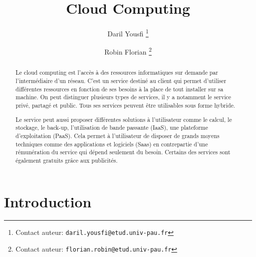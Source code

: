 \documentclass[a4 paper, 12 pt]{article}
\author[1]{Daril Yousfi \thanks{Contact auteur: \texttt{daril.yousfi@etud.univ-pau.fr}} \and {Robin Florian \thanks{Contact auteur: \texttt{florian.robin@etud.univ-pau.fr}}}}
\title{Cloud Computing}
\date {}
\begin{document}
\maketitle

\tableofcontents

\listoffigures

\listoftables

\newpage

\begin{abstract}
Le cloud computing est l’accès à des ressources informatiques sur demande par l’intermédiaire d’un réseau. C’est un service destiné au client qui permet d’utiliser différentes ressources en fonction de ses besoins à la place de tout installer sur sa machine. On peut distinguer plusieurs types de services, il y a notamment le service privé, partagé et public. Tous ses services peuvent être utilisables sous forme hybride. \newline

Le service peut aussi proposer différentes solutions à l’utilisateur comme le calcul, le stockage, le back-up, l’utilisation de bande passante (IaaS), une plateforme d’exploitation (PaaS). Cela permet à l’utilisateur de disposer de grands moyens techniques comme des applications et logiciels (Saas) en contrepartie d’une rémunération du service qui dépend seulement du besoin. Certains des services sont également gratuits grâce aux publicités.
\end{abstract}

 \section{Introduction}
\end{document}

